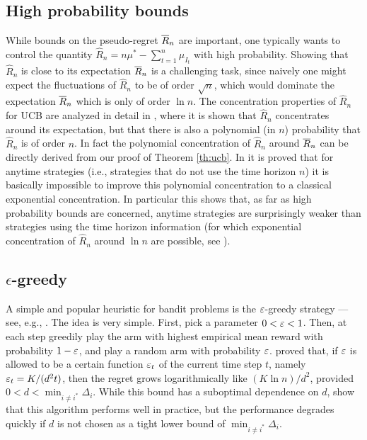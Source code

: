 \subsection{High probability bounds}
While bounds on the pseudo-regret $\overline{R}_n$ are important, one typically wants to control the quantity $\hat{R}_n = n \mu^* - \sum_{t=1}^n \mu_{I_t}$ with high probability. Showing that $\hat{R}_n$ is close to its expectation $\overline{R}_n$ is a challenging task, since naively one might expect the fluctuations of $\hat{R}_n$ to be of order $\sqrt{n}$, which would dominate the expectation $\overline{R}_n$ which is only of order $\ln n$. The concentration properties of $\hat{R}_n$ for UCB are analyzed in detail in \cite{AMS09}, where it is shown that $\hat{R}_n$ concentrates around its expectation, but that there is also a polynomial (in $n$) probability that $\hat{R}_n$ is of order $n$. In fact the polynomial concentration of $\hat{R}_n$ around $\overline{R}_n$ can be directly derived from our proof of Theorem \ref{th:ucb}. In \cite{SA11} it is proved that for anytime strategies (i.e., strategies that do not use the time horizon $n$) it is basically impossible to improve this polynomial concentration to a classical exponential concentration.
In particular this shows that, as far as high probability bounds are concerned, anytime strategies are surprisingly weaker than strategies using the time horizon information (for which exponential concentration of $\hat{R}_n$ around $\ln n$ are possible, see \cite{AMS09}). 


\subsection{$\epsilon$-greedy}
A simple and popular heuristic for bandit problems is the $\varepsilon$-greedy strategy ---see, e.g., \cite{SB98}. The idea is very simple. First, pick a parameter $0 < \varepsilon < 1$. Then, at each step greedily play the arm with highest empirical mean reward with probability $1-\varepsilon$, and play a random arm with probability $\varepsilon$. \cite{ACF02} proved that, if $\varepsilon$ is allowed to be a certain function $\varepsilon_t$ of the current time step $t$, namely $\varepsilon_t = K/(d^2 t)$, then the regret grows logarithmically like $(K \ln n)/d^2$, provided $0 < d < \min_{i \neq i^*} \Delta_i$. While this bound has a suboptimal dependence on $d$, \cite{ACF02} show that this algorithm performs well in practice, but the performance degrades quickly if $d$ is not chosen as a tight lower bound of $\min_{i \neq i^*} \Delta_i$.

